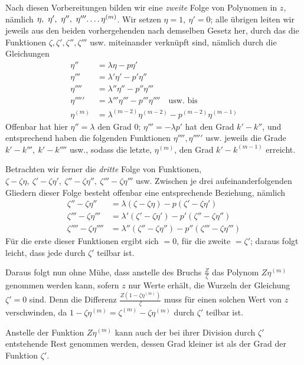 Nach diesen Vorbereitungen bilden wir eine \textit{zweite} Folge von Polynomen in $z$, nämlich $\eta,\ \eta',\ \eta'',\ \eta'''\ldotp\ldotp\ldotp\ldotp\eta^{(m)}$. Wir setzen $\eta=1,\ \eta'=0$; alle übrigen leiten wir jeweils aus den beiden vorhergehenden nach demselben Gesetz her, durch das die Funktionen $\zeta,\zeta',\zeta'',\zeta'''$ usw. miteinander verknüpft sind, nämlich durch die Gleichungen
\[
\begin{aligned}
\eta''&=\lambda\eta-p\eta'\\
\eta'''&=\lambda'\eta'-p'\eta''\\
\eta''''&=\lambda''\eta''-p''\eta'''\\
\eta'''''&=\lambda'''\eta'''-p'''\eta''''\quad\text{usw. bis}\\
\eta^{(m)}&=\lambda^{(m-2)}\eta^{(m-2)}-p^{(m-2)}\eta^{(m-1)}
\end{aligned}
\]
Offenbar hat hier $\eta''=\lambda$ den Grad $0$; $\eta'''=-\lambda p'$ hat den Grad $k'-k''$, und entsprechend haben die folgenden Funktionen $\eta'''',\eta'''''$ usw. jeweils die Grade $k'-k''',\ k'-k''''$ usw., sodass die letzte, $\eta^{(m)}$, den Grad $k'-k^{(m-1)}$ erreicht.

Betrachten wir ferner die \textit{dritte} Folge von Funktionen, $\zeta-\zeta\eta,\ \zeta'-\zeta\eta',\ \zeta''-\zeta\eta'',\ \zeta'''-\zeta\eta'''$ usw. Zwischen je drei aufeinanderfolgenden Gliedern dieser Folge besteht offenbar eine entsprechende Beziehung, nämlich
\[
\begin{aligned}
\zeta''-\zeta\eta''&=\lambda(\zeta-\zeta\eta)-p(\zeta'-\zeta\eta')\\
\zeta'''-\zeta\eta'''&=\lambda'(\zeta'-\zeta\eta')-p'(\zeta''-\zeta\eta'')\\
\zeta''''-\zeta\eta''''&=\lambda''(\zeta''-\zeta\eta'')-p''(\zeta'''-\zeta\eta''')
\end{aligned}
\]
Für die erste dieser Funktionen ergibt sich $=0$, für die zweite $=\zeta'$; daraus folgt leicht, dass jede durch $\zeta'$ teilbar ist.

Daraus folgt nun ohne Mühe, dass anstelle des Bruchs $\frac Z\zeta$ das Polynom $Z\eta^{(m)}$ genommen werden kann, sofern $z$ nur Werte erhält, die Wurzeln der Gleichung $\zeta'=0$ sind. Denn die Differenz $\frac{Z(1-\zeta\eta^{(m)})}{\zeta}$ muss für einen solchen Wert von $z$ verschwinden, da $1-\zeta\eta^{(m)}=\zeta^{(m)}-\zeta\eta^{(m)}$ durch $\zeta'$ teilbar ist.

Anstelle der Funktion $Z\eta^{(m)}$ kann auch der bei ihrer Division durch $\zeta'$ entstehende Rest genommen werden, dessen Grad kleiner ist als der Grad der Funktion $\zeta'$.


